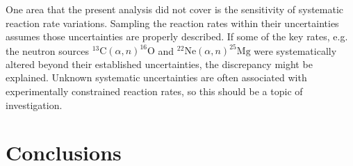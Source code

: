 One area that the present analysis did not cover is the sensitivity of systematic reaction rate variations. Sampling the reaction rates within their uncertainties assumes those uncertainties are properly described. If some of the key rates, e.g. the neutron sources $^{13}\mathrm{C}(\alpha,n)^{16}\mathrm{O}$ and $^{22}\mathrm{Ne}(\alpha,n)^{25}\mathrm{Mg}$ were systematically altered beyond their established uncertainties, the discrepancy might be explained. Unknown systematic uncertainties are often associated with experimentally constrained reaction rates, so this should be a topic of investigation.






\section{Conclusions}

